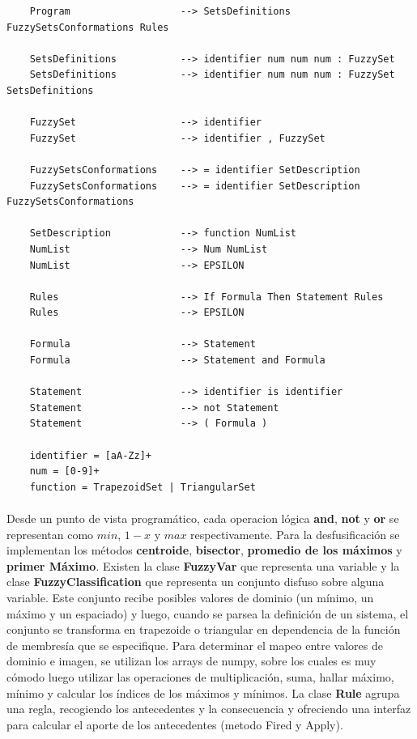 \documentclass[a4paper, 12pt]{article}
\begin{document}
\begin{verbatim}
    Program                   --> SetsDefinitions FuzzySetsConformations Rules

    SetsDefinitions           --> identifier num num num : FuzzySet
    SetsDefinitions           --> identifier num num num : FuzzySet SetsDefinitions

    FuzzySet                  --> identifier
    FuzzySet                  --> identifier , FuzzySet

    FuzzySetsConformations    --> = identifier SetDescription
    FuzzySetsConformations    --> = identifier SetDescription FuzzySetsConformations

    SetDescription            --> function NumList
    NumList                   --> Num NumList
    NumList                   --> EPSILON

    Rules                     --> If Formula Then Statement Rules
    Rules                     --> EPSILON

    Formula                   --> Statement
    Formula                   --> Statement and Formula

    Statement                 --> identifier is identifier
    Statement                 --> not Statement
    Statement                 --> ( Formula )

    identifier = [aA-Zz]+
    num = [0-9]+
    function = TrapezoidSet | TriangularSet
\end{verbatim}
\paragraph{}
Desde un punto de vista program\'atico, cada operacion l\'ogica \textbf{and}, \textbf{not} y \textbf{or} se
representan como \textbf{$min$}, \textbf{$1 - x$} y \textbf{$max$} respectivamente. Para la desfusificaci\'on
se implementan los m\'etodos \textbf{centroide}, \textbf{bisector}, \textbf{promedio de los m\'aximos} y 
\textbf{primer M\'aximo}. Existen la clase \textbf{FuzzyVar} que representa una variable y la clase 
\textbf{FuzzyClassification} que representa un conjunto disfuso sobre alguna variable. Este conjunto
recibe posibles valores de dominio (un m\'inimo, un m\'aximo y un espaciado) y luego, cuando se parsea
la definici\'on de un sistema, el conjunto se transforma en trapezoide o triangular en dependencia de la
funci\'on de membres\'ia que se especifique. Para determinar el mapeo entre valores de dominio e imagen,
se utilizan los arrays de numpy, sobre los cuales es muy c\'omodo luego utilizar las operaciones de multiplicaci\'on,
suma, hallar m\'aximo, m\'inimo y calcular los \'indices de los m\'aximos y m\'inimos.
La clase \textbf{Rule} agrupa una regla, recogiendo los antecedentes y la consecuencia y ofreciendo una interfaz
para calcular el aporte de los antecedentes (metodo Fired y Apply).
\end{document}
